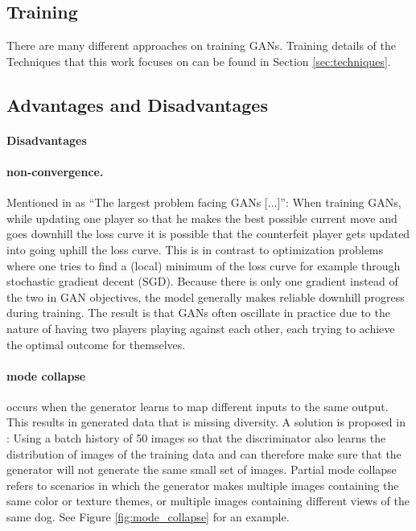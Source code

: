 \subsection{Training}
There are many different approaches on training GANs. Training details of the Techniques that this work focuses on can be found in Section \ref{sec:techniques}.


\subsection{Advantages and Disadvantages}
\paragraph{Disadvantages}
\paragraph{non-convergence.} Mentioned in \cite{DBLP:journals/corr/Goodfellow17} as ``The largest problem facing GANs [...]'': When training GANs, while updating one player so that he makes the best possible current move and goes downhill the loss curve it is possible that the counterfeit player gets updated into going uphill the loss curve. This is in contrast to optimization problems where one tries to find a (local) minimum of the loss curve for example through stochastic gradient decent (SGD). Because there is only one gradient instead of the two in GAN objectives, the model generally makes reliable downhill progress during training. The result is that GANs often oscillate in practice due to the nature of having two players playing against each other, each trying to achieve the optimal outcome for themselves. 

\paragraph{mode collapse} occurs when the generator learns to map different inputs to the same output. This results in generated data that is missing diversity. A solution is proposed in \cite{DBLP:journals/corr/ZhuPIE17}: Using a batch history of 50 images so that the discriminator also learns the distribution of images of the training data and can therefore make sure that the generator will not generate the same small set of images. Partial mode collapse refers to scenarios in which the generator makes multiple images containing the same color or texture themes, or multiple images containing different views of the same dog. See Figure \ref{fig:mode_collapse} for an example.

